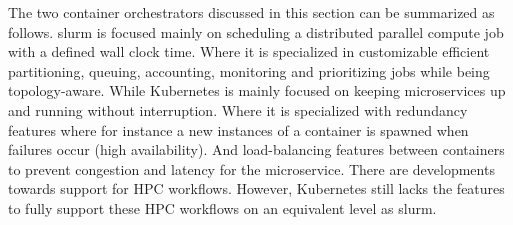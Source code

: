 \documentclass[conference]{IEEEtran}
\begin{document}


The two container orchestrators discussed in this section can be summarized as follows. \gls{slurm} is focused mainly on scheduling a distributed parallel compute job with a defined wall clock time. Where it is specialized in customizable efficient partitioning, queuing, accounting, monitoring and prioritizing jobs while being topology-aware. While Kubernetes is mainly focused on keeping microservices up and running without interruption. Where it is specialized with redundancy features where for instance a new instances of a container is spawned when failures occur (high availability). And load-balancing features between containers to prevent congestion and latency for the microservice. There are developments towards support for HPC workflows. However, Kubernetes still lacks the features to fully support these HPC workflows on an equivalent level as \gls{slurm}.




\end{document}
